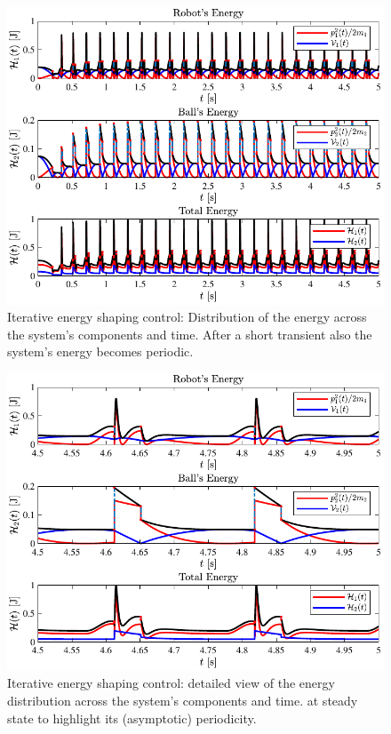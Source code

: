 \begin{figure}[hb!]
	\centering
	\includegraphics[width=\linewidth]{Figures/ctrl4.pdf}
	\caption[Iterative energy shaping control: Distribution of the energy across the system's components and time]{Iterative energy shaping control: Distribution of the energy across the system's components and time. After a short transient also the system's energy becomes periodic.}
	\label{fig:ctrl4}
\end{figure}
%
\begin{figure}[ht!]
	\centering
	\includegraphics[width=\linewidth]{Figures/ctrl4_det.pdf}
	\caption[Iterative energy shaping control: detailed view of the energy distribution across the system's components and time]{Iterative energy shaping control: detailed view of the energy distribution across the system's components and time. at steady state to highlight its (asymptotic) periodicity.}
	\label{fig:ctrl4_det}
\end{figure}
